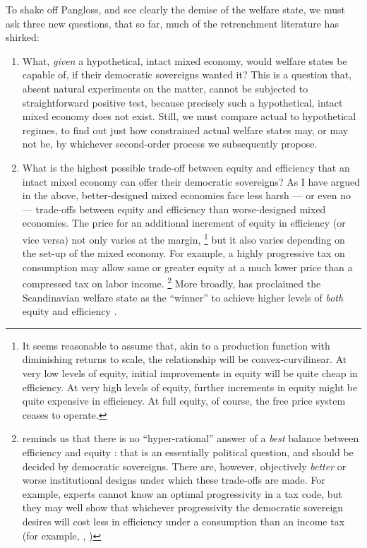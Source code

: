 
To shake off Pangloss, and see clearly the demise of the welfare state, we must ask three new questions, that so far, much of the retrenchment literature has shirked:
\begin{enumerate}
	\item What, \emph{given} a hypothetical, intact mixed economy, would welfare states be capable of, if their democratic sovereigns wanted it?
	This is a question that, absent natural experiments on the matter, cannot be subjected to straightforward positive test, because precisely such a hypothetical, intact mixed economy does not exist.
Still, we must compare actual to hypothetical regimes, to find out just how constrained actual welfare states may, or may not be, by whichever second-order process we subsequently propose.

	\item What is the highest possible trade-off between equity and efficiency that an intact mixed economy can offer their democratic sovereigns?
	As I have argued in the above, better-designed mixed economies face less harsh --- or even no --- trade-offs between equity and efficiency than worse-designed mixed economies.
	The price for an additional increment of equity in efficiency (or vice versa) not only varies at the margin,
	\footnote{
		It seems reasonable to assume that, akin to a production function with diminishing returns to scale, the relationship will be convex-curvilinear.
		At very low levels of equity, initial improvements in equity will be quite cheap in efficiency.
		At very high levels of equity, further increments in equity might be quite expensive in efficiency.
		At full equity, of course, the free price system ceases to operate.
	}
	but it also varies depending on the set-up of the mixed economy.
	For example, a highly progressive tax on consumption may allow same or greater equity at a much lower price than a compressed tax on labor income.
	\footnote{
		\citeauthor{Offe2003} reminds us that there is no ``hyper-rational'' answer of a \emph{best} balance between efficiency and equity \citeyearpar[445]{Offe2003}:
		that is an essentially political question, and should be decided by democratic sovereigns.
		There are, however, objectively \emph{better} or {worse} institutional designs under which these trade-offs are made.
		For example, experts cannot know an optimal progressivity in a tax code, but they may well show that whichever progressivity the democratic sovereign desires will cost less in efficiency under a consumption than an income tax (for example, \citealt{McCaffery2005}, \citealt{Frank2005})
	}
	More broadly, \citeauthor{Ganssmann2010} has proclaimed the Scandinavian welfare state as the ``winner'' to achieve higher levels of \emph{both} equity and efficiency \citeyearpar[343]{Ganssmann2010}.


\end{enumerate}

